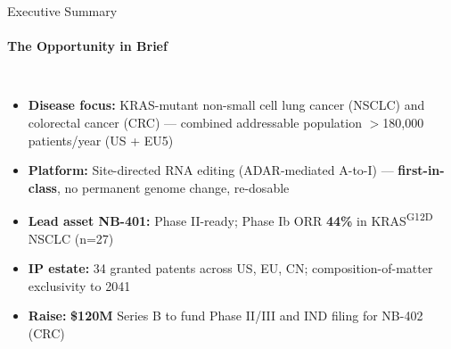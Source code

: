 \documentclass[aspectratio=169,10pt]{beamer}
\newcommand{\highlight}[1]{\textcolor{TealAccent}{\textbf{#1}}}
\begin{document}
\begin{frame}{Executive Summary}
  \framesubtitle{The Opportunity in Brief}
  \begin{columns}[T,onlytextwidth]
    \small
    \begin{itemize}\setlength\itemsep{5pt}
      \item[\textcolor{TealAccent}{\faFlask}]
        \textbf{Disease focus:} KRAS-mutant non-small cell lung cancer
        (NSCLC) and colorectal cancer (CRC) --- combined addressable
        population $>$180{,}000 patients/year (US + EU5)
      \item[\textcolor{TealAccent}{\faDna}]
        \textbf{Platform:} Site-directed RNA editing (ADAR-mediated
        A-to-I) --- \highlight{first-in-class}, no permanent genome
        change, re-dosable
      \item[\textcolor{TealAccent}{\faChartBar}]
        \textbf{Lead asset NB-401:} Phase II-ready; Phase Ib ORR
        \highlight{44\%} in KRAS\textsuperscript{G12D} NSCLC (n=27)
      \item[\textcolor{TealAccent}{\faBriefcase}]
        \textbf{IP estate:} 34 granted patents across US, EU, CN;
        composition-of-matter exclusivity to 2041
      \item[\textcolor{TealAccent}{\faDollarSign}]
        \textbf{Raise:} \highlight{\$120M} Series B to fund Phase II/III
        and IND filing for NB-402 (CRC)
    \end{itemize}


\end{columns}
\end{frame}
\end{document}

